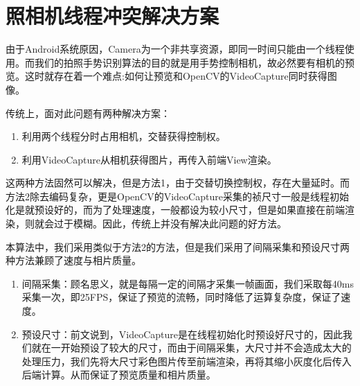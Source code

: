 \documentclass{XDBAthesis}
\begin{document}
\section{照相机线程冲突解决方案}
由于Android系统原因，Camera为一个非共享资源，即同一时间只能由一个线程使用。而我们的拍照手势识别算法的目的就是用手势控制相机，故必然要有相机的预览。这时就存在着一个难点:如何让预览和OpenCV的VideoCapture同时获得图像。

传统上，面对此问题有两种解决方案：
\begin{enumerate}
    \item 利用两个线程分时占用相机，交替获得控制权。
    \item 利用VideoCapture从相机获得图片，再传入前端View渲染。
\end{enumerate}
这两种方法固然可以解决，但是方法1，由于交替切换控制权，存在大量延时。而方法2除去编码复杂，更是OpenCV的VideoCapture采集的祯尺寸一般是线程初始化是就预设好的，而为了处理速度，一般都设为较小尺寸，但是如果直接在前端渲染，则就会过于模糊。因此，传统上并没有解决此问题的好方法。

本算法中，我们采用类似于方法2的方法，但是我们采用了间隔采集和预设尺寸两种方法兼顾了速度与相片质量。
\begin{enumerate}
    \item 间隔采集：顾名思义，就是每隔一定的间隔才采集一帧画面，我们采取每40ms采集一次，即25FPS，保证了预览的流畅，同时降低了运算复杂度，保证了速度。
    \item 预设尺寸：前文说到，VideoCapture是在线程初始化时预设好尺寸的，因此我们就在一开始预设了较大的尺寸，而由于间隔采集，大尺寸并不会造成太大的处理压力，我们先将大尺寸彩色图片传至前端渲染，再将其缩小灰度化后传入后端计算。从而保证了预览质量和相片质量。
\end{enumerate}
\end{document}
